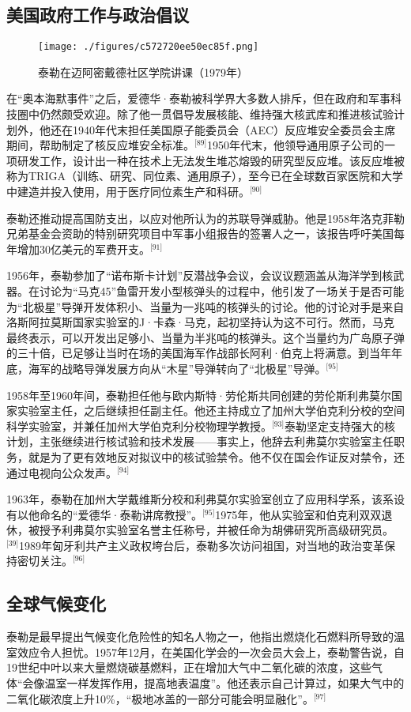 \subsection{美国政府工作与政治倡议}
\begin{figure}[ht]
\centering
\texttt{[image: ./figures/c572720ee50ec85f.png]}
\caption{泰勒在迈阿密戴德社区学院讲课（1979年）} \label{fig_ADHTL_12}
\end{figure}
在“奥本海默事件”之后，爱德华·泰勒被科学界大多数人排斥，但在政府和军事科技圈中仍然颇受欢迎。除了他一贯倡导发展核能、维持强大核武库和推进核试验计划外，他还在1940年代末担任美国原子能委员会（AEC）反应堆安全委员会主席期间，帮助制定了核反应堆安全标准。\(^\text{[89]}\)1950年代末，他领导通用原子公司的一项研发工作，设计出一种在技术上无法发生堆芯熔毁的研究型反应堆。该反应堆被称为TRIGA（训练、研究、同位素、通用原子），至今已在全球数百家医院和大学中建造并投入使用，用于医疗同位素生产和科研。\(^\text{[90]}\)

泰勒还推动提高国防支出，以应对他所认为的苏联导弹威胁。他是1958年洛克菲勒兄弟基金会资助的特别研究项目中军事小组报告的签署人之一，该报告呼吁美国每年增加30亿美元的军费开支。\(^\text{[91]}\)

1956年，泰勒参加了“诺布斯卡计划”反潜战争会议，会议议题涵盖从海洋学到核武器。在讨论为“马克45”鱼雷开发小型核弹头的过程中，他引发了一场关于是否可能为“北极星”导弹开发体积小、当量为一兆吨的核弹头的讨论。他的讨论对手是来自洛斯阿拉莫斯国家实验室的J·卡森·马克，起初坚持认为这不可行。然而，马克最终表示，可以开发出足够小、当量为半兆吨的核弹头。这个当量约为广岛原子弹的三十倍，已足够让当时在场的美国海军作战部长阿利·伯克上将满意。到当年年底，海军的战略导弹发展方向从“木星”导弹转向了“北极星”导弹。\(^\text{[95]}\)

1958年至1960年间，泰勒担任他与欧内斯特·劳伦斯共同创建的劳伦斯利弗莫尔国家实验室主任，之后继续担任副主任。他还主持成立了加州大学伯克利分校的空间科学实验室，并兼任加州大学伯克利分校物理学教授。\(^\text{[93]}\)泰勒坚定支持强大的核计划，主张继续进行核试验和技术发展——事实上，他辞去利弗莫尔实验室主任职务，就是为了更有效地反对拟议中的核试验禁令。他不仅在国会作证反对禁令，还通过电视向公众发声。\(^\text{[94]}\)

1963年，泰勒在加州大学戴维斯分校和利弗莫尔实验室创立了应用科学系，该系设有以他命名的“爱德华·泰勒讲席教授”。\(^\text{[95]}\)1975年，他从实验室和伯克利双双退休，被授予利弗莫尔实验室名誉主任称号，并被任命为胡佛研究所高级研究员。\(^\text{[39]}\)1989年匈牙利共产主义政权垮台后，泰勒多次访问祖国，对当地的政治变革保持密切关注。\(^\text{[96]}\)
\subsection{全球气候变化}
泰勒是最早提出气候变化危险性的知名人物之一，他指出燃烧化石燃料所导致的温室效应令人担忧。1957年12月，在美国化学会的一次会员大会上，泰勒警告说，自19世纪中叶以来大量燃烧碳基燃料，正在增加大气中二氧化碳的浓度，这些气体“会像温室一样发挥作用，提高地表温度”。他还表示自己计算过，如果大气中的二氧化碳浓度上升10\%，“极地冰盖的一部分可能会明显融化”。\(^\text{[97]}\)

